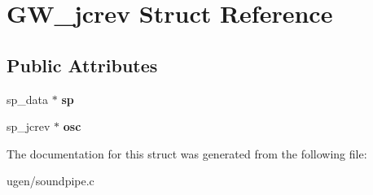 \hypertarget{structGW__jcrev}{}\section{G\+W\+\_\+jcrev Struct Reference}
\label{structGW__jcrev}
\subsection*{Public Attributes}
\begin{DoxyCompactItemize}
\item 
\hypertarget{structGW__jcrev_acdafb73cdb62e96b9ddfbae8b27a8ed5}{}\label{structGW__jcrev_acdafb73cdb62e96b9ddfbae8b27a8ed5} 
sp\+\_\+data $\ast$ {\bfseries sp}
\item 
\hypertarget{structGW__jcrev_a566becc6c2405fe82334545fd0271dc4}{}\label{structGW__jcrev_a566becc6c2405fe82334545fd0271dc4} 
sp\+\_\+jcrev $\ast$ {\bfseries osc}
\end{DoxyCompactItemize}


The documentation for this struct was generated from the following file\+:\begin{DoxyCompactItemize}
\item 
ugen/soundpipe.\+c\end{DoxyCompactItemize}
